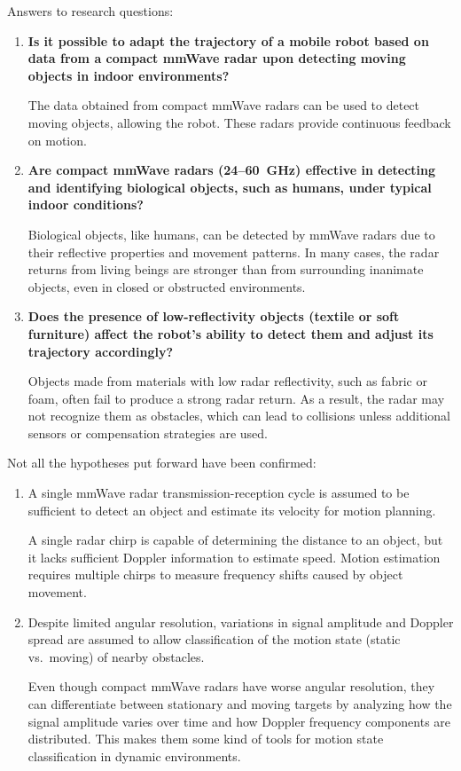 \noindent
Answers to research questions:
\begin{enumerate}
    \item \textbf{Is it possible to adapt the trajectory of a mobile robot based on data from a compact mmWave radar upon detecting moving objects in indoor environments?}

    The data obtained from compact mmWave radars can be used to detect moving objects, allowing the robot. These radars provide continuous feedback on motion.
    \item \textbf{Are compact mmWave radars (24--60~GHz) effective in detecting and identifying biological objects, such as humans, under typical indoor conditions?}

    Biological objects, like humans, can be detected by mmWave radars due to their reflective properties and movement patterns. In many cases, the radar returns from living beings are stronger than from surrounding inanimate objects, even in closed or obstructed environments.

    \item \textbf{Does the presence of low-reflectivity objects (textile or soft furniture) affect the robot’s ability to detect them and adjust its trajectory accordingly?}

    Objects made from materials with low radar reflectivity, such as fabric or foam, often fail to produce a strong radar return. As a result, the radar may not recognize them as obstacles, which can lead to collisions unless additional sensors or compensation strategies are used.
\end{enumerate}

\noindent
Not all the hypotheses put forward have been confirmed:
\begin{enumerate}
    \item A single mmWave radar transmission-reception cycle is assumed to be sufficient to detect an object and estimate its velocity for motion planning.

    A single radar chirp is capable of determining the distance to an object, but it lacks sufficient Doppler information to estimate speed. Motion estimation requires multiple chirps to measure frequency shifts caused by object movement.

    \item Despite limited angular resolution, variations in signal amplitude and Doppler spread are assumed to allow classification of the motion state (static vs.\ moving) of nearby obstacles.

    Even though compact mmWave radars have worse angular resolution, they can differentiate between stationary and moving targets by analyzing how the signal amplitude varies over time and how Doppler frequency components are distributed. This makes them some kind of tools for motion state classification in dynamic environments.
\end{enumerate}


